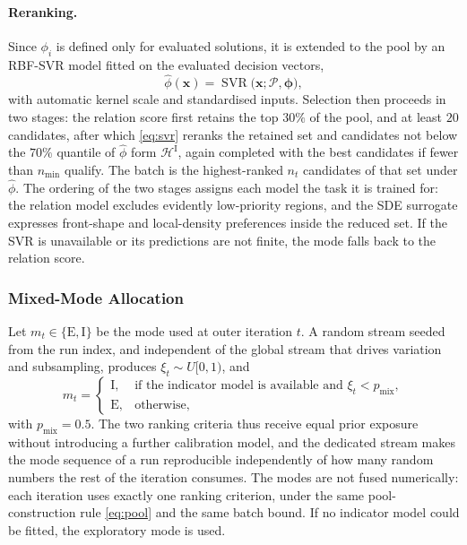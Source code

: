 \documentclass[11pt,a4paper]{article}
\newcommand{\vx}{\mathbf{x}}
\begin{document}
\paragraph{Reranking.}
Since $\phi_i$ is defined only for evaluated solutions, it is extended to the
pool by an RBF-SVR model fitted on the evaluated decision vectors,
\begin{equation}
\widehat\phi(\vx)=\operatorname{SVR}
\bigl(\vx;\mathcal{P},\bm{\phi}\bigr),
\label{eq:svr}
\end{equation}
with automatic kernel scale and standardised inputs. Selection then proceeds in
two stages: the relation score first retains the top $30\%$ of the pool, and at
least $20$ candidates, after which \eqref{eq:svr} reranks the retained set and
candidates not below the $70\%$ quantile of $\widehat\phi$ form
$\mathcal{H}^{\mathrm{I}}$, again completed with the best candidates if fewer
than $n_{\min}$ qualify. The batch is the highest-ranked $n_t$ candidates of that
set under $\widehat\phi$. The ordering of the two stages assigns each model the
task it is trained for: the relation model excludes evidently low-priority
regions, and the SDE surrogate expresses front-shape and local-density
preferences inside the reduced set. If the SVR is unavailable or its predictions
are not finite, the mode falls back to the relation score.

\subsubsection{Mixed-Mode Allocation}
\label{sec:method:candidate:mix}

Let $m_t\in\{\mathrm{E},\mathrm{I}\}$ be the mode used at outer iteration $t$. A
random stream seeded from the run index, and independent of the global stream
that drives variation and subsampling, produces $\xi_t\sim U[0,1)$, and
\begin{equation}
m_t=
\begin{cases}
\mathrm{I}, & \text{if the indicator model is available and }
              \xi_t<p_{\mathrm{mix}},\\[2pt]
\mathrm{E}, & \text{otherwise},
\end{cases}
\label{eq:mode}
\end{equation}
with $p_{\mathrm{mix}}=0.5$. The two ranking criteria thus receive equal prior
exposure without introducing a further calibration model, and the dedicated
stream makes the mode sequence of a run reproducible independently of how many
random numbers the rest of the iteration consumes. The modes are not fused
numerically: each iteration uses exactly one ranking criterion, under the same
pool-construction rule \eqref{eq:pool} and the same batch bound. If no indicator
model could be fitted, the exploratory mode is used.
\end{document}
